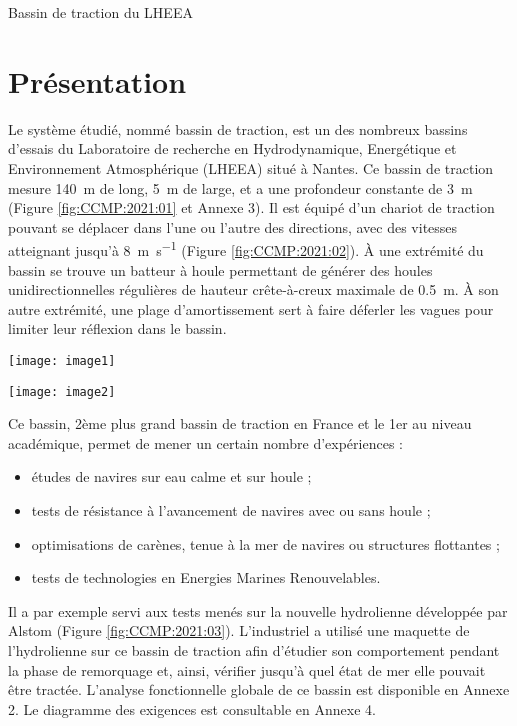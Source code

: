 Bassin de traction du LHEEA

\section{Présentation}
Le système étudié, nommé bassin de traction, est un des nombreux bassins d'essais du Laboratoire de recherche en Hydrodynamique, Energétique et Environnement Atmosphérique (LHEEA) situé à Nantes.
Ce bassin de traction mesure \SI{140}{m} de long, \SI{5}{m} de large, et a une profondeur constante de \SI{3}{m} (Figure \ref{fig:CCMP:2021:01} et Annexe 3). Il est équipé d’un chariot de traction pouvant se déplacer dans l’une ou l’autre des directions, avec des vitesses atteignant jusqu’à \SI{8}{m.s^{-1}} (Figure \ref{fig:CCMP:2021:02}). À une extrémité du bassin se trouve un batteur à houle permettant de générer des houles unidirectionnelles régulières de hauteur crête-à-creux maximale de \SI{0,5}{m}. À son autre extrémité, une plage d’amortissement sert à faire déferler les vagues pour limiter leur réflexion dans le bassin.


\begin{multicols}{2}
\begin{center}
\texttt{[image: image1]}
\end{center}

\begin{center}
\texttt{[image: image2]}
\end{center}
\end{multicols}

Ce bassin, 2ème plus grand bassin de traction en France et le 1er au niveau académique, permet de mener un certain nombre d’expériences :
\begin{itemize}
	\item études de navires sur eau calme et sur houle ;
	\item tests de résistance à l'avancement de navires avec ou sans houle ;
	\item optimisations de carènes, tenue à la mer de navires ou structures flottantes ;
	\item tests de technologies en Energies Marines Renouvelables.
\end{itemize}
 
Il a par exemple servi aux tests menés sur la nouvelle hydrolienne développée par Alstom (Figure \ref{fig:CCMP:2021:03}).
L’industriel a utilisé une maquette de l’hydrolienne sur ce bassin de traction afin d’étudier son comportement pendant la phase de remorquage et, ainsi, vérifier jusqu’à quel état de mer elle pouvait être tractée.
L’analyse fonctionnelle globale de ce bassin est disponible en Annexe 2. Le diagramme des exigences est consultable en Annexe 4.
 
